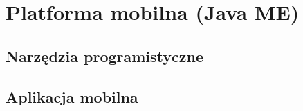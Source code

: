 \section{Platforma mobilna (Java ME)}
\subsection{Narzędzia programistyczne}
\subsection{Aplikacja mobilna}